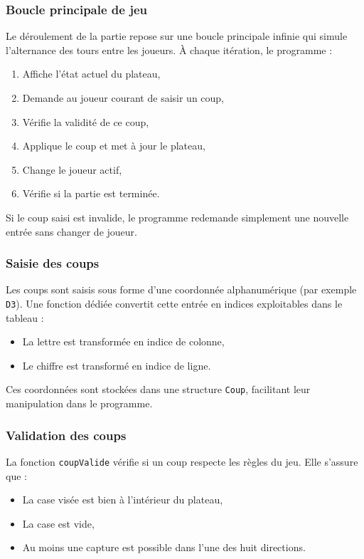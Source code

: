 \documentclass{article}
\begin{document}
\subsubsection{Boucle principale de jeu}

Le déroulement de la partie repose sur une boucle principale infinie qui simule l'alternance des tours entre les joueurs. À chaque itération, le programme :

\begin{enumerate}
    \item Affiche l'état actuel du plateau,
    \item Demande au joueur courant de saisir un coup,
    \item Vérifie la validité de ce coup,
    \item Applique le coup et met à jour le plateau,
    \item Change le joueur actif,
    \item Vérifie si la partie est terminée.
\end{enumerate}

Si le coup saisi est invalide, le programme redemande simplement une nouvelle entrée sans changer de joueur.

\subsubsection{Saisie des coups}

Les coups sont saisis sous forme d'une coordonnée alphanumérique (par exemple \texttt{D3}). Une fonction dédiée convertit cette entrée en indices exploitables dans le tableau :

\begin{itemize}
    \item La lettre est transformée en indice de colonne,
    \item Le chiffre est transformé en indice de ligne.
\end{itemize}

Ces coordonnées sont stockées dans une structure \texttt{Coup}, facilitant leur manipulation dans le programme.

\subsubsection{Validation des coups}

La fonction \texttt{coupValide} vérifie si un coup respecte les règles du jeu. Elle s'assure que :

\begin{itemize}
    \item La case visée est bien à l'intérieur du plateau,
    \item La case est vide,
    \item Au moins une capture est possible dans l'une des huit directions.
\end{itemize}
\end{document}

